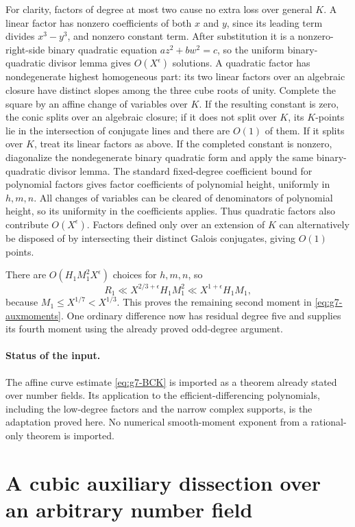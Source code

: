 \documentclass[11pt,reqno]{amsart}
\numberwithin{equation}{section}
\theoremstyle{definition}
\begin{document}
For clarity, factors of degree at most two cause no extra loss over general
$K$.  A linear factor has nonzero coefficients of both $x$ and $y$, since
its leading term divides $x^3-y^3$, and nonzero constant term.
After substitution it is a nonzero-right-side binary quadratic equation
$az^2+bw^2=c$, so the uniform binary-quadratic divisor lemma gives
$O(X^\epsilon)$ solutions.
A quadratic factor has nondegenerate highest homogeneous part: its two
linear factors over an algebraic closure have distinct slopes among the
three cube roots of unity.  Complete the square by an affine change of
variables over $K$.  If the resulting constant is zero, the conic splits
over an algebraic closure; if it does not split over $K$, its $K$-points lie
in the intersection of conjugate lines and there are $O(1)$ of them.
If it splits over $K$, treat its linear factors as above.
If the completed constant is nonzero, diagonalize the nondegenerate binary
quadratic form and apply the same binary-quadratic divisor lemma.
The standard fixed-degree coefficient bound for polynomial factors gives
factor coefficients of polynomial height, uniformly in $h,m,n$.
All changes of variables can be cleared of denominators of polynomial
height, so its uniformity in the coefficients applies.
Thus quadratic factors also contribute $O(X^\epsilon)$.
Factors defined only over an extension of $K$ can alternatively be disposed
of by intersecting their distinct Galois conjugates, giving $O(1)$ points.

There are $O(H_1M_1^2X^\epsilon)$ choices for $h,m,n$, so
\[
 R_1\ll X^{2/3+\epsilon}H_1M_1^2
       \ll X^{1+\epsilon}H_1M_1,
\]
because $M_1\le X^{1/7}<X^{1/3}$.
This proves the remaining second moment in \eqref{eq:g7-auxmoments}.
One ordinary difference now has residual degree five and supplies its fourth
moment using the already proved odd-degree argument.

\paragraph{Status of the input.}
The affine curve estimate \eqref{eq:g7-BCK} is imported as a theorem already
stated over number fields.  Its application to the efficient-differencing
polynomials, including the low-degree factors and the narrow complex supports,
is the adaptation proved here.  No numerical smooth-moment exponent from a
rational-only theorem is imported.


\section{A cubic auxiliary dissection over an arbitrary number field}
\label{sec:g7-cubic}
\end{document}
